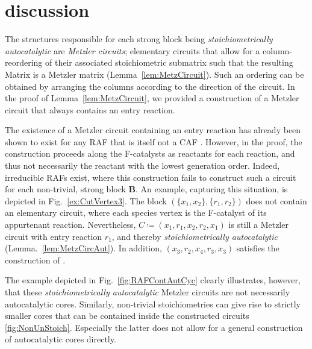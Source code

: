 \documentclass[pdflatex]{sn-jnl}
\theoremstyle{thmstyleone}%
\theoremstyle{examplesty}%
\theoremstyle{thmstylethree}%
\newcommand{\block}[0]{\mathbf{B}}
\newcommand{\holy}[1]{\begingroup\color{royalpurple}#1\endgroup}
\begin{document}
\section{discussion}
\holy{
The structures responsible for each strong block being \emph{stoichiometrically autocatalytic} are \emph{Metzler circuits}; elementary circuits that allow for a column-reordering of their associated stoichiometric submatrix such that the resulting Matrix is a Metzler matrix (Lemma~\ref{lem:MetzCircuit}). Such an ordering can be obtained by arranging the columns according to the direction of the circuit. In the proof of Lemma~\ref{lem:MetzCircuit}, we provided a construction of a Metzler circuit that always contains an entry reaction.}

\holy{The existence of a Metzler circuit containing an entry reaction has already been shown to exist for any RAF that is itself not a CAF \cite[Thm.~3.1]{golnik_bridging_2026}. However, in the proof, the construction proceeds along the F-catalysts as reactants for each reaction, and thus not necessarily the reactant with the lowest generation order. Indeed, irreducible RAFs exist, where this construction fails to construct such a circuit for each non-trivial, strong block $\block$. An example, capturing this situation, is depicted in Fig.~\ref{ex:CutVertex3}. The block $(\{x_1,x_2\}, \{r_1,r_2\})$ does not contain an elementary circuit, where each species vertex is the F-catalyst of its appurtenant reaction. Nevertheless, $C\coloneqq (x_1,r_1,x_2,r_2,x_1)$ is still a Metzler circuit with entry reaction $r_1$, and thereby \emph{stoichiometrically autocatalytic} (Lemma.~\ref{lem:MetzCircAut}). In addition, $(x_3,r_2,x_4,r_3, x_3)$ satisfies the construction of \cite[Thm.~3.1]{golnik_bridging_2026}.


The example depicted in Fig.~\ref{fig:RAFContAutCyc} clearly illustrates, however, that these \emph{stoichiometrically autocatalytic} Metzler circuits are not necessarily autocatalytic cores. Similarly, non-trivial stoichiometries can give rise to strictly smaller cores that can be contained inside the constructed circuits \ref{fig:NonUnStoich}. Especially the latter does not allow for a general construction of autocatalytic cores directly.} 
\end{document}
